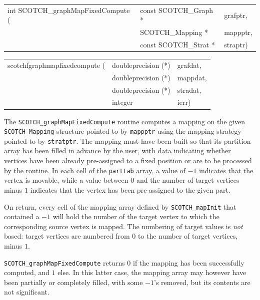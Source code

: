 \begin{itemize}
\progsyn

{\tt\begin{tabular}{l@{}ll}
int SCOTCH\_graphMapFixedCompute ( & const SCOTCH\_Graph * & grafptr, \\
                                   & SCOTCH\_Mapping *     & mappptr, \\
                                   & const SCOTCH\_Strat * & straptr)
\end{tabular}}

{\tt\begin{tabular}{l@{}ll}
scotchfgraphmapfixedcompute ( & doubleprecision (*) & grafdat, \\
                              & doubleprecision (*) & mappdat, \\
                              & doubleprecision (*) & stradat, \\
                              & integer             & ierr)
\end{tabular}}

\progdes

The {\tt SCOTCH\_graphMapFixedCompute} routine computes a mapping on
the given {\tt SCOTCH\_\lbt Mapping} structure pointed to by
{\tt mappptr} using the mapping strategy pointed to by
{\tt stratptr}. The mapping must have been built so that its partition
array has been filled in advance by the user, with data indicating
whether vertices have been already pre-assigned to a fixed position or
are to be processed by the routine. In each cell of the {\tt parttab}
array, a value of $-1$ indicates that the vertex is movable, while a
value between $0$ and the number of target vertices minus $1$
indicates that the vertex has been pre-assigned to the given part.

On return, every cell of the mapping array defined by
{\tt SCOTCH\_\lbt map\lbt Init} that contained a $-1$ will hold
the number of the target vertex to which the corresponding source
vertex is mapped. The numbering of target values is {\em not\/} based:
target vertices are numbered from $0$ to the number of target
vertices, minus $1$.

\progret

{\tt SCOTCH\_graphMapFixedCompute} returns $0$ if the mapping has been
successfully computed, and $1$ else. In this latter case, the mapping
array may however have been partially or completely filled, with some
$-1$'s removed, but its contents are not significant.
\end{itemize}

